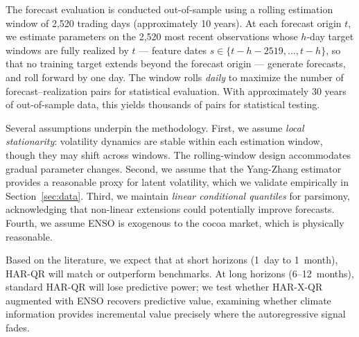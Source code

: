 The forecast evaluation is conducted out-of-sample using a rolling estimation
window of 2,520 trading
days (approximately 10 years). At each forecast origin $t$, we estimate
parameters on the 2,520 most recent observations whose $h$-day target
windows are fully realized by $t$ --- feature dates
$s \in \{t-h-2519, \ldots, t-h\}$, so that no training target extends
beyond the forecast origin --- generate forecasts, and roll forward by one
day. The window rolls \emph{daily} to maximize the number of
forecast--realization pairs for statistical evaluation. With approximately
30 years of out-of-sample data, this yields thousands of pairs for
statistical testing.

Several assumptions underpin the methodology. First, we assume \emph{local
stationarity}: volatility dynamics are stable within each estimation window,
though they may shift across windows. The rolling-window design
accommodates gradual parameter changes. Second, we assume that the
Yang-Zhang estimator provides a reasonable proxy for latent volatility,
which we validate empirically in Section~\ref{sec:data}. Third, we maintain
\emph{linear conditional quantiles} for parsimony, acknowledging that
non-linear extensions could potentially improve forecasts. Fourth, we
assume ENSO is exogenous to the cocoa market, which is physically
reasonable.

Based on the literature, we expect that at short horizons (1~day to
1~month), HAR-QR will match or outperform benchmarks. At long horizons
(6--12~months), standard HAR-QR will lose predictive power; we test whether
HAR-X-QR augmented with ENSO recovers predictive value, examining whether
climate information provides incremental value precisely where the
autoregressive signal fades.

